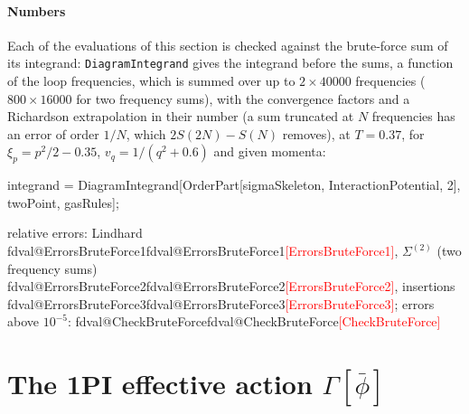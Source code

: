 \documentclass[11pt,a4paper]{article}
\makeatletter
\newcommand{\pkg}[1]{\texttt{#1}}
\newcommand{\val}[1]{\ifcsname fdval@#1\endcsname\csname fdval@#1\endcsname\else\textcolor{red}{[#1]}\fi}
\makeatother
\begin{document}
\paragraph{Numbers} Each of the evaluations of this section is checked against the brute-force sum of its integrand: \pkg{DiagramIntegrand}
gives the integrand before the sums, a function of the loop frequencies, which is summed over up to $2\times40000$
frequencies ($800\times16000$ for two frequency sums), with the convergence factors and a Richardson extrapolation in their
number (a sum truncated at $N$ frequencies has an error of order $1/N$, which $2S(2N)-S(N)$ removes), at $T=0.37$, for $\xi_p=p^2/2-0.35$, $v_q=1/(q^2+0.6)$ and given momenta:
\begin{code}
integrand = DiagramIntegrand[OrderPart[sigmaSkeleton, InteractionPotential, 2],
    twoPoint, gasRules];
\end{code}
\begin{result}
relative errors: Lindhard \val{ErrorsBruteForce1}, $\Sigma^{(2)}$ (two frequency sums) \val{ErrorsBruteForce2}, insertions
\val{ErrorsBruteForce3}; errors above $10^{-5}$: \val{CheckBruteForce}
\end{result}

\section{The 1PI effective action \texorpdfstring{$\Gamma[\bar\phi]$}{Gamma[phibar]}}\label{sec:onepi}
\end{document}
